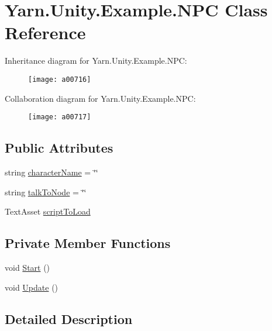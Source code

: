 \hypertarget{a00134}{\section{Yarn.\-Unity.\-Example.\-N\-P\-C Class Reference}
\label{a00134}
}


Inheritance diagram for Yarn.\-Unity.\-Example.\-N\-P\-C\-:
\nopagebreak
\begin{figure}[H]
\begin{center}
\leavevmode
\texttt{[image: a00716]}
\end{center}
\end{figure}


Collaboration diagram for Yarn.\-Unity.\-Example.\-N\-P\-C\-:
\nopagebreak
\begin{figure}[H]
\begin{center}
\leavevmode
\texttt{[image: a00717]}
\end{center}
\end{figure}
\subsection*{Public Attributes}
\begin{DoxyCompactItemize}
\item 
string \hyperlink{a00134_a418ea7095bd8201559ed392f07905ca3}{character\-Name} = \char`\"{}\char`\"{}
\item 
string \hyperlink{a00134_a64f4f1fb66b2046a674e3ebf3b9fdb56}{talk\-To\-Node} = \char`\"{}\char`\"{}
\item 
Text\-Asset \hyperlink{a00134_a63145fb6ddf357e604d71bac04ca8a60}{script\-To\-Load}
\end{DoxyCompactItemize}
\subsection*{Private Member Functions}
\begin{DoxyCompactItemize}
\item 
void \hyperlink{a00134_a0bf37075312ea87c2e329cc363a328a6}{Start} ()
\item 
void \hyperlink{a00134_ab1bea5afabd1c2e1e991063b1579d062}{Update} ()
\end{DoxyCompactItemize}


\subsection{Detailed Description}


